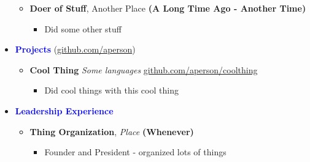 \documentclass[11pt]{article}
\begin{document}
\begin{flushleft}
\begin{itemize}
\begin{itemize}
            \item \textbf{Doer of Stuff}, Another Place \hfill{\textbf{(A Long Time Ago - Another Time)}}
                \begin{itemize}
                    \item Did some other stuff
                \end{itemize}
        \end{itemize}
    \item[] \Large \textcolor{blue}{\textbf{Projects}} (\href{https://github.com/aperson}{github.com/aperson}) \normalsize
        \begin{itemize}
            \item \textbf{Cool Thing} \textit{Some languages} \hfill{\href{https://github.com/aperson/coolthing}{github.com/aperson/coolthing}}
                \begin{itemize}
                    \item Did cool things with this cool thing
                \end{itemize}
        \end{itemize}
    \item[] \Large \textcolor{blue}{\textbf{Leadership Experience}} \normalsize
        \begin{itemize}
            \item \textbf{Thing Organization}, \textit{Place} \hfill{\textbf{(Whenever)}}
                \begin{itemize}
                    \item Founder and President - organized lots of things
                \end{itemize}
        \end{itemize}
\end{itemize}

\end{flushleft}
\end{document}
